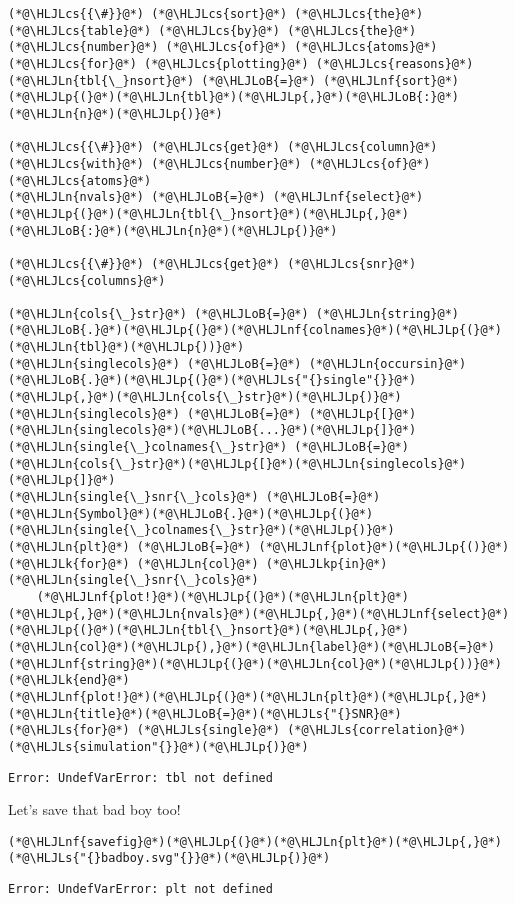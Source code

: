 \documentclass[12pt,a4paper]{article}
\newcommand{\HLJLk}[1]{\textcolor[RGB]{148,91,176}{\textbf{#1}}}
\newcommand{\HLJLkp}[1]{\textcolor[RGB]{148,91,176}{\textbf{#1}}}
\newcommand{\HLJLn}[1]{#1}
\newcommand{\HLJLnf}[1]{\textcolor[RGB]{66,102,213}{#1}}
\newcommand{\HLJLs}[1]{\textcolor[RGB]{201,61,57}{#1}}
\newcommand{\HLJLoB}[1]{\textcolor[RGB]{102,102,102}{\textbf{#1}}}
\newcommand{\HLJLp}[1]{#1}
\newcommand{\HLJLcs}[1]{\textcolor[RGB]{153,153,119}{\textit{#1}}}
\begin{document}
\begin{lstlisting}
(*@\HLJLcs{{\#}}@*) (*@\HLJLcs{sort}@*) (*@\HLJLcs{the}@*) (*@\HLJLcs{table}@*) (*@\HLJLcs{by}@*) (*@\HLJLcs{the}@*) (*@\HLJLcs{number}@*) (*@\HLJLcs{of}@*) (*@\HLJLcs{atoms}@*) (*@\HLJLcs{for}@*) (*@\HLJLcs{plotting}@*) (*@\HLJLcs{reasons}@*)
(*@\HLJLn{tbl{\_}nsort}@*) (*@\HLJLoB{=}@*) (*@\HLJLnf{sort}@*)(*@\HLJLp{(}@*)(*@\HLJLn{tbl}@*)(*@\HLJLp{,}@*)(*@\HLJLoB{:}@*)(*@\HLJLn{n}@*)(*@\HLJLp{)}@*)

(*@\HLJLcs{{\#}}@*) (*@\HLJLcs{get}@*) (*@\HLJLcs{column}@*) (*@\HLJLcs{with}@*) (*@\HLJLcs{number}@*) (*@\HLJLcs{of}@*) (*@\HLJLcs{atoms}@*)
(*@\HLJLn{nvals}@*) (*@\HLJLoB{=}@*) (*@\HLJLnf{select}@*)(*@\HLJLp{(}@*)(*@\HLJLn{tbl{\_}nsort}@*)(*@\HLJLp{,}@*)(*@\HLJLoB{:}@*)(*@\HLJLn{n}@*)(*@\HLJLp{)}@*)

(*@\HLJLcs{{\#}}@*) (*@\HLJLcs{get}@*) (*@\HLJLcs{snr}@*) (*@\HLJLcs{columns}@*)

(*@\HLJLn{cols{\_}str}@*) (*@\HLJLoB{=}@*) (*@\HLJLn{string}@*)(*@\HLJLoB{.}@*)(*@\HLJLp{(}@*)(*@\HLJLnf{colnames}@*)(*@\HLJLp{(}@*)(*@\HLJLn{tbl}@*)(*@\HLJLp{))}@*)
(*@\HLJLn{singlecols}@*) (*@\HLJLoB{=}@*) (*@\HLJLn{occursin}@*)(*@\HLJLoB{.}@*)(*@\HLJLp{(}@*)(*@\HLJLs{"{}single"{}}@*)(*@\HLJLp{,}@*)(*@\HLJLn{cols{\_}str}@*)(*@\HLJLp{)}@*)
(*@\HLJLn{singlecols}@*) (*@\HLJLoB{=}@*) (*@\HLJLp{[}@*)(*@\HLJLn{singlecols}@*)(*@\HLJLoB{...}@*)(*@\HLJLp{]}@*)
(*@\HLJLn{single{\_}colnames{\_}str}@*) (*@\HLJLoB{=}@*) (*@\HLJLn{cols{\_}str}@*)(*@\HLJLp{[}@*)(*@\HLJLn{singlecols}@*)(*@\HLJLp{]}@*)
(*@\HLJLn{single{\_}snr{\_}cols}@*) (*@\HLJLoB{=}@*) (*@\HLJLn{Symbol}@*)(*@\HLJLoB{.}@*)(*@\HLJLp{(}@*)(*@\HLJLn{single{\_}colnames{\_}str}@*)(*@\HLJLp{)}@*)
(*@\HLJLn{plt}@*) (*@\HLJLoB{=}@*) (*@\HLJLnf{plot}@*)(*@\HLJLp{()}@*)
(*@\HLJLk{for}@*) (*@\HLJLn{col}@*) (*@\HLJLkp{in}@*) (*@\HLJLn{single{\_}snr{\_}cols}@*)
    (*@\HLJLnf{plot!}@*)(*@\HLJLp{(}@*)(*@\HLJLn{plt}@*)(*@\HLJLp{,}@*)(*@\HLJLn{nvals}@*)(*@\HLJLp{,}@*)(*@\HLJLnf{select}@*)(*@\HLJLp{(}@*)(*@\HLJLn{tbl{\_}nsort}@*)(*@\HLJLp{,}@*)(*@\HLJLn{col}@*)(*@\HLJLp{),}@*)(*@\HLJLn{label}@*)(*@\HLJLoB{=}@*)(*@\HLJLnf{string}@*)(*@\HLJLp{(}@*)(*@\HLJLn{col}@*)(*@\HLJLp{))}@*)
(*@\HLJLk{end}@*)
(*@\HLJLnf{plot!}@*)(*@\HLJLp{(}@*)(*@\HLJLn{plt}@*)(*@\HLJLp{,}@*)(*@\HLJLn{title}@*)(*@\HLJLoB{=}@*)(*@\HLJLs{"{}SNR}@*) (*@\HLJLs{for}@*) (*@\HLJLs{single}@*) (*@\HLJLs{correlation}@*) (*@\HLJLs{simulation"{}}@*)(*@\HLJLp{)}@*)
\end{lstlisting}

\begin{lstlisting}
Error: UndefVarError: tbl not defined
\end{lstlisting}


Let's save that bad boy too!


\begin{lstlisting}
(*@\HLJLnf{savefig}@*)(*@\HLJLp{(}@*)(*@\HLJLn{plt}@*)(*@\HLJLp{,}@*)(*@\HLJLs{"{}badboy.svg"{}}@*)(*@\HLJLp{)}@*)
\end{lstlisting}

\begin{lstlisting}
Error: UndefVarError: plt not defined
\end{lstlisting}
\end{document}
